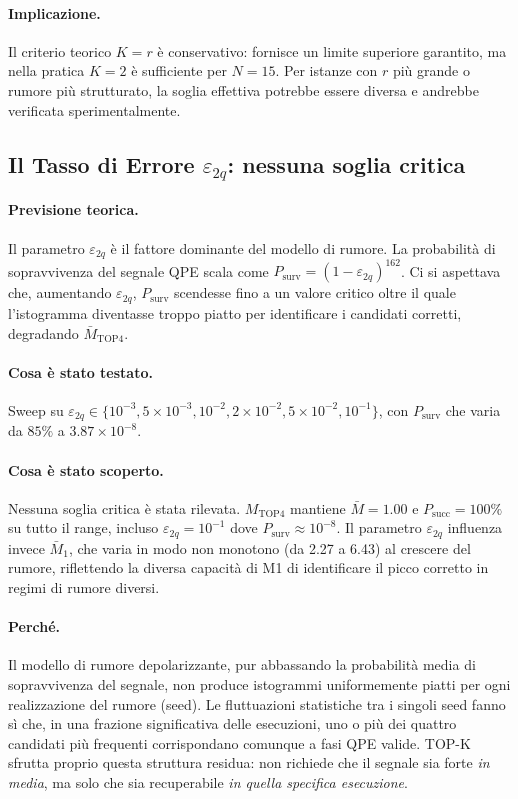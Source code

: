 \begin{onehalfspace}
\paragraph{Implicazione.}
Il criterio teorico $K = r$ è conservativo: fornisce un limite superiore garantito, ma nella pratica $K = 2$ è sufficiente per $N=15$. Per istanze con $r$ più grande o rumore più strutturato, la soglia effettiva potrebbe essere diversa e andrebbe verificata sperimentalmente.

\subsection{Il Tasso di Errore $\varepsilon_{2q}$: nessuna soglia critica}

\paragraph{Previsione teorica.}
Il parametro $\varepsilon_{2q}$ è il fattore dominante del modello di rumore. La probabilità di sopravvivenza del segnale QPE scala come $P_{\text{surv}} = (1-\varepsilon_{2q})^{162}$. Ci si aspettava che, aumentando $\varepsilon_{2q}$, $P_{\text{surv}}$ scendesse fino a un valore critico oltre il quale l'istogramma diventasse troppo piatto per identificare i candidati corretti, degradando $\bar{M}_{\text{TOP4}}$.

\paragraph{Cosa è stato testato.}
Sweep su $\varepsilon_{2q} \in \{10^{-3}, 5\times10^{-3}, 10^{-2}, 2\times10^{-2}, 5\times10^{-2}, 10^{-1}\}$, con $P_{\text{surv}}$ che varia da $85\%$ a $3.87\times10^{-8}$.

\paragraph{Cosa è stato scoperto.}
Nessuna soglia critica è stata rilevata. $M_{\text{TOP4}}$ mantiene $\bar{M}=1.00$ e $P_{\text{succ}}=100\%$ su tutto il range, incluso $\varepsilon_{2q}=10^{-1}$ dove $P_{\text{surv}} \approx 10^{-8}$. Il parametro $\varepsilon_{2q}$ influenza invece $\bar{M}_1$, che varia in modo non monotono (da 2.27 a 6.43) al crescere del rumore, riflettendo la diversa capacità di M1 di identificare il picco corretto in regimi di rumore diversi.

\paragraph{Perché.}
Il modello di rumore depolarizzante, pur abbassando la probabilità media di sopravvivenza del segnale, non produce istogrammi uniformemente piatti per ogni realizzazione del rumore (seed). Le fluttuazioni statistiche tra i singoli seed fanno sì che, in una frazione significativa delle esecuzioni, uno o più dei quattro candidati più frequenti corrispondano comunque a fasi QPE valide. TOP-K sfrutta proprio questa struttura residua: non richiede che il segnale sia forte \emph{in media}, ma solo che sia recuperabile \emph{in quella specifica esecuzione}.


\end{onehalfspace}
